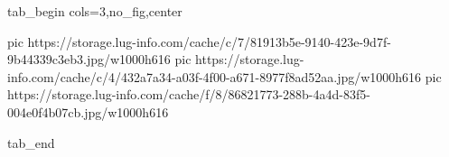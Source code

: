  
 
 
 
 


\ifcmt
  tab_begin cols=3,no_fig,center

     pic https://storage.lug-info.com/cache/c/7/81913b5e-9140-423e-9d7f-9b44339c3eb3.jpg/w1000h616%
		 pic https://storage.lug-info.com/cache/c/4/432a7a34-a03f-4f00-a671-8977f8ad52aa.jpg/w1000h616%
		 pic https://storage.lug-info.com/cache/f/8/86821773-288b-4a4d-83f5-004e0f4b07cb.jpg/w1000h616%

  tab_end
\fi
